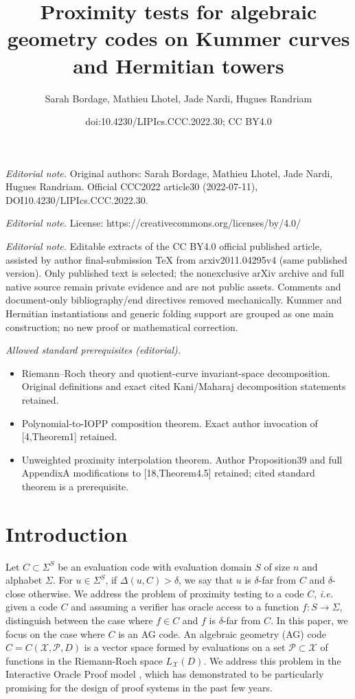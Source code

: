 \documentclass[10pt,a4paper]{article}
\title{Proximity tests for algebraic geometry codes on Kummer curves and Hermitian towers}
\author{Sarah Bordage, Mathieu Lhotel, Jade Nardi, Hugues Randriam}
\date{doi:10.4230/LIPIcs.CCC.2022.30; CC BY4.0}
\newcommand\calX{\mathcal{X}}
\newcommand\calP{\mathcal{P}}
\theoremstyle{plain}
\theoremstyle{plain}
\theoremstyle{definition}
\theoremstyle{remark}
\theoremstyle{plain}
\begin{document}
\maketitle
\noindent\textit{Editorial note.} Original authors: Sarah Bordage, Mathieu Lhotel, Jade Nardi, Hugues Randriam. Official CCC2022 article30 (2022-07-11), DOI10.4230/LIPIcs.CCC.2022.30.\par\medskip
\noindent\textit{Editorial note.} License: https://creativecommons.org/licenses/by/4.0/\par\medskip
\noindent\textit{Editorial note.} Editable extracts of the CC BY4.0 official published article, assisted by author final-submission TeX from arxiv2011.04295v4 (same published version). Only published text is selected; the nonexclusive arXiv archive and full native source remain private evidence and are not public assets. Comments and document-only bibliography/end directives removed mechanically. Kummer and Hermitian instantiations and generic folding support are grouped as one main construction; no new proof or mathematical correction.\par\medskip
\noindent\textit{Allowed standard prerequisites (editorial).}\begin{itemize}
\item Riemann--Roch theory and quotient-curve invariant-space decomposition. Original definitions and exact cited Kani/Maharaj decomposition statements retained.
\item Polynomial-to-IOPP composition theorem. Exact author invocation of [4,Theorem1] retained.
\item Unweighted proximity interpolation theorem. Author Proposition39 and full AppendixA modifications to [18,Theorem4.5] retained; cited standard theorem is a prerequisite.
\end{itemize}\medskip
\section{Introduction}
Let $C \subset \Sigma^S$ be an evaluation code with evaluation domain $S$ of size $n$ and alphabet $\Sigma$.
For $u \in \Sigma^S$, if $\Delta(u, C) > \delta$, we say that $u$ is $\delta$-far from $C$ and $\delta$-close otherwise. We address the problem of proximity testing to a code $C$, \textit{i.e.} given a code $C$ and assuming a verifier has oracle access to a function $f : S \rightarrow \Sigma$, distinguish between the case where $f \in C$ and $f$ is $\delta$-far from $C$. In this paper, we focus on the case where $C$ is an AG code. An algebraic geometry (AG) code $C = C(\calX, \calP, D)$ is a vector space formed by evaluations on a set $\calP\subset \calX$ of functions in the Riemann-Roch space $L_\calX(D)$. We address this problem in the Interactive Oracle Proof model \cite{BCS16}, which has demonstrated to be particularly promising for the design of proof systems in the past few years.
\end{document}
